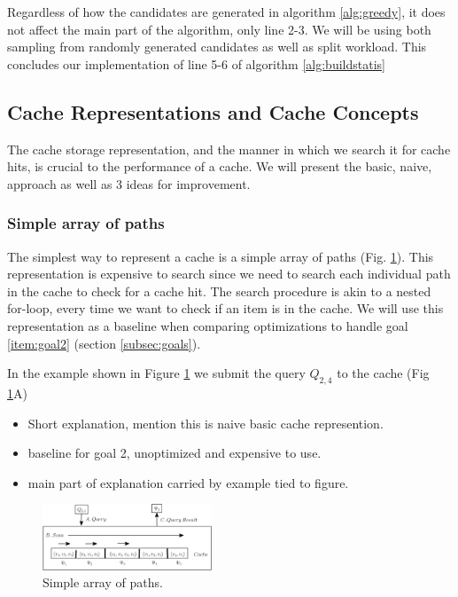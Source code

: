 Regardless of how the candidates are generated in algorithm \ref{alg:greedy}, it does not affect the main part of the algorithm, only line 2-3. We will be using both sampling from randomly generated candidates as well as split workload. This concludes our implementation of line 5-6 of algorithm \ref{alg:buildstatis}


\subsection{Cache Representations and Cache Concepts} \label{subsec:cacherepresentatons}
The cache storage representation, and the manner in which we search it for cache hits, is crucial to the performance of a cache. We will present the basic, naive, approach as well as 3 ideas for improvement.
% 
\subsubsection{Simple array of paths}
The simplest way to represent a cache is a simple array of paths (Fig. \ref{fig:cachearray}). This representation is expensive to search since we need to search each individual path in the cache to check for a cache hit. The search procedure is akin to a nested for-loop, every time we want to check if an item is in the cache. We will use this representation as a baseline when comparing optimizations to handle goal \ref{item:goal2} (section \ref{subsec:goals}).

In the example shown in Figure \ref{fig:cachearray} we submit the query $Q_{2,4}$ to the cache (Fig \ref{fig:cachearray}A) 

\begin{itemize}
\item Short explanation, mention this is naive basic cache represention.
\item baseline for goal 2, unoptimized and expensive to use.
\item main part of explanation carried by example tied to figure.
\end{itemize}

\begin{figure}[hbt]
  \center
        \includegraphics[width=0.45\textwidth]{figures/cachearray.pdf}
        \caption{Simple array of paths.}
  \label{fig:cachearray}
\end{figure}


